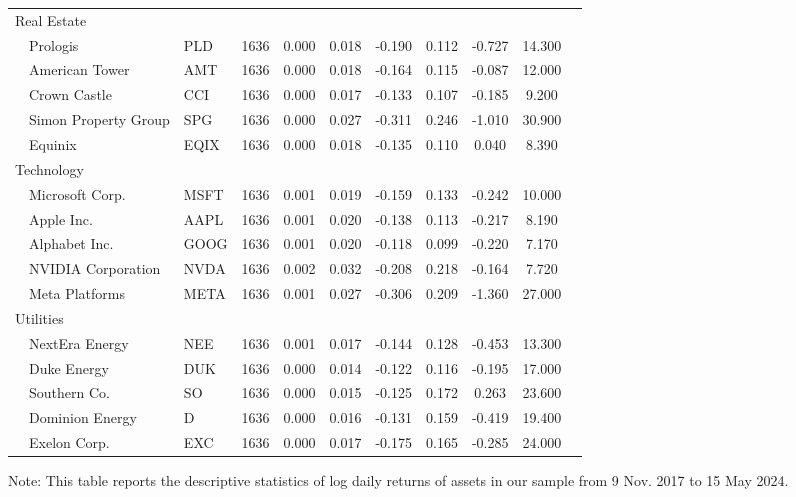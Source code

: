 \documentclass{article}
\begin{document}
\begin{table}[H]
\begin{threeparttable}
\begin{tabular}{p{1.75cm}p{3.5cm}lcccccccc}
\multicolumn{2}{l}{ Real Estate} \\[1mm]
& Prologis           & PLD  & 1636 & 0.000 & 0.018 & -0.190 & 0.112 & -0.727 & 14.300 \\
& American Tower     & AMT  & 1636 & 0.000 & 0.018 & -0.164 & 0.115 & -0.087 & 12.000 \\
& Crown Castle       & CCI  & 1636 & 0.000 & 0.017 & -0.133 & 0.107 & -0.185 & 9.200 \\
& Simon Property Group & SPG & 1636 & 0.000 & 0.027 & -0.311 & 0.246 & -1.010 & 30.900 \\
& Equinix            & EQIX & 1636 & 0.000 & 0.018 & -0.135 & 0.110 & 0.040  & 8.390 \\
\multicolumn{2}{l}{Technology}  \\[1mm]
& Microsoft Corp.    & MSFT & 1636 & 0.001 & 0.019 & -0.159 & 0.133 & -0.242 & 10.000 \\      
& Apple Inc.         & AAPL & 1636 & 0.001 & 0.020 & -0.138 & 0.113 & -0.217 & 8.190 \\
& Alphabet Inc.      & GOOG & 1636 & 0.001 & 0.020 & -0.118 & 0.099 & -0.220 & 7.170 \\
& NVIDIA Corporation & NVDA & 1636 & 0.002 & 0.032 & -0.208 & 0.218 & -0.164 & 7.720 \\
& Meta Platforms     & META & 1636 & 0.001 & 0.027 & -0.306 & 0.209 & -1.360 & 27.000 \\
\multicolumn{2}{l}{Utilities}\\[1mm]
& NextEra Energy     & NEE & 1636 & 0.001 & 0.017 & -0.144 & 0.128 & -0.453 & 13.300 \\
& Duke Energy        & DUK & 1636 & 0.000 & 0.014 & -0.122 & 0.116 & -0.195 & 17.000 \\
& Southern Co.       & SO  & 1636 & 0.000 & 0.015 & -0.125 & 0.172 & 0.263  & 23.600 \\
& Dominion Energy    & D   & 1636 & 0.000& 0.016 & -0.131 & 0.159 & -0.419 & 19.400 \\
& Exelon Corp.       & EXC & 1636 & 0.000 & 0.017 & -0.175 & 0.165 & -0.285 & 24.000 \\
\bottomrule
\end{tabular}
\begin{tablenotes}      
\item Note: This table reports the descriptive statistics of log daily returns of assets in our sample from 9 Nov. 2017 to 15 May 2024.
\end{tablenotes}
\end{threeparttable}
\end{table}
\end{document}

